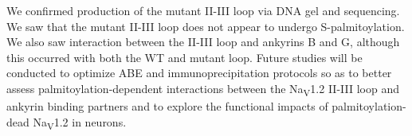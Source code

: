 { %
We confirmed production of the mutant II-III loop via DNA gel and sequencing. We saw that the mutant II-III loop does not appear to undergo S-palmitoylation. We also saw interaction between the II-III loop and ankyrins B and G, although this occurred with both the WT and mutant loop.
}
{ %
Future studies will be conducted to optimize ABE and immunoprecipitation protocols so as to better assess palmitoylation-dependent interactions between the Na\textsubscript{V}1.2 II-III loop and ankyrin binding partners and to explore the functional impacts of palmitoylation-dead Na\textsubscript{V}1.2 in neurons.
}
 \newpage